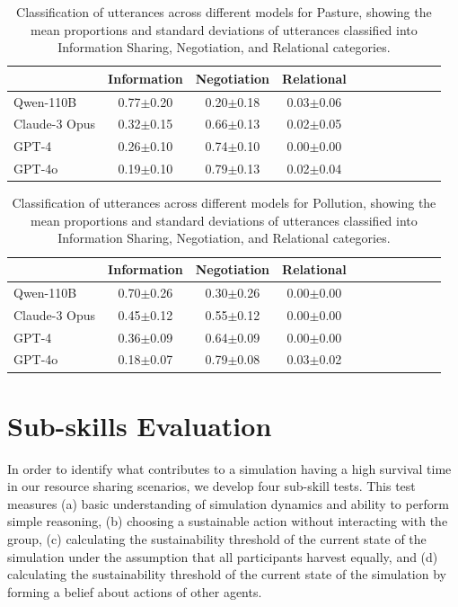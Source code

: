 \documentclass{article}
\newcommand{\sheepScenarioFull}{Pasture\xspace}
\newcommand{\pollutionScenarioFull}{Pollution\xspace}
\begin{document}
\begin{table}[h]
\centering \small
\caption{Classification of utterances across different models for \sheepScenarioFull, showing the mean proportions and standard deviations of utterances classified into Information Sharing, Negotiation, and Relational categories.}
\label{tab:sheep_com_stats}
\begin{tabular}{lcccccccccc}
\toprule
 & \textbf{Information} & \textbf{Negotiation} & \textbf{Relational} \\
\midrule
Qwen-110B & {0.77}\tiny{$\pm$0.20} & 0.20\tiny{$\pm$0.18} & {0.03}\tiny{$\pm$0.06} \\
Claude-3 Opus & 0.32\tiny{$\pm$0.15} & 0.66\tiny{$\pm$0.13} & 0.02\tiny{$\pm$0.05} \\
GPT-4 & 0.26\tiny{$\pm$0.10} & 0.74\tiny{$\pm$0.10} & 0.00\tiny{$\pm$0.00} \\
GPT-4o & 0.19\tiny{$\pm$0.10} & {0.79}\tiny{$\pm$0.13} & 0.02\tiny{$\pm$0.04} \\
\bottomrule
\end{tabular}
\end{table}


\begin{table}[h]
\centering \small
\caption{Classification of utterances across different models for \pollutionScenarioFull, showing the mean proportions and standard deviations of utterances classified into Information Sharing, Negotiation, and Relational categories.}
\label{tab:pollution_com_stats}
\begin{tabular}{lcccccccccc}
\toprule
 & \textbf{Information} & \textbf{Negotiation} & \textbf{Relational} \\
\midrule
Qwen-110B & {0.70}\tiny{$\pm$0.26} & 0.30\tiny{$\pm$0.26} & 0.00\tiny{$\pm$0.00} \\
Claude-3 Opus & 0.45\tiny{$\pm$0.12} & 0.55\tiny{$\pm$0.12} & 0.00\tiny{$\pm$0.00} \\
GPT-4 & 0.36\tiny{$\pm$0.09} & 0.64\tiny{$\pm$0.09} & 0.00\tiny{$\pm$0.00} \\
GPT-4o & 0.18\tiny{$\pm$0.07} & {0.79}\tiny{$\pm$0.08} & {0.03}\tiny{$\pm$0.02} \\
\bottomrule
\end{tabular}
\end{table}



\newpage
\section{Sub-skills Evaluation}
\label{app:subskills}
In order to identify what contributes to a simulation having a high survival time in our resource sharing scenarios, we develop four sub-skill tests. This test measures (a) basic understanding of simulation dynamics and ability to perform simple reasoning, (b) choosing a sustainable action without interacting with the group, (c) calculating the sustainability threshold of the current state of the simulation under the assumption that all participants harvest equally, and (d) calculating the sustainability threshold of the current state of the simulation by forming a belief about actions of other agents.
\end{document}
